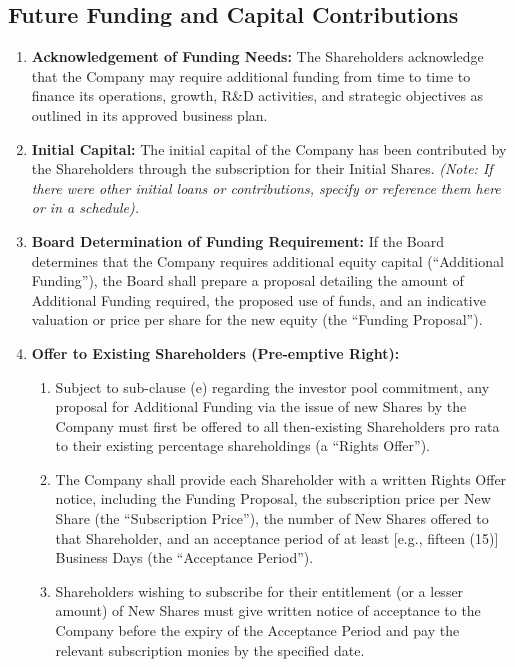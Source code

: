 \subsection{Future Funding and Capital Contributions} \label{subsec:FutureFunding}
\begin{enumerate}[label=(\alph*)]
\item \textbf{Acknowledgement of Funding Needs:} The Shareholders acknowledge that the Company may require additional funding from time to time to finance its operations, growth, R\&D activities, and strategic objectives as outlined in its approved business plan.
\item \textbf{Initial Capital:} The initial capital of the Company has been contributed by the Shareholders through the subscription for their Initial Shares. \textit{(Note: If there were other initial loans or contributions, specify or reference them here or in a schedule).}
\item \textbf{Board Determination of Funding Requirement:} If the Board determines that the Company requires additional equity capital (``Additional Funding''), the Board shall prepare a proposal detailing the amount of Additional Funding required, the proposed use of funds, and an indicative valuation or price per share for the new equity (the ``Funding Proposal'').
\item \textbf{Offer to Existing Shareholders (Pre-emptive Right):}
    \begin{enumerate}[label=(\roman*)]
    \item Subject to sub-clause (e) regarding the investor pool commitment, any proposal for Additional Funding via the issue of new Shares by the Company must first be offered to all then-existing Shareholders pro rata to their existing percentage shareholdings (a ``Rights Offer'').
    \item The Company shall provide each Shareholder with a written Rights Offer notice, including the Funding Proposal, the subscription price per New Share (the ``Subscription Price''), the number of New Shares offered to that Shareholder, and an acceptance period of at least [e.g., fifteen (15)] Business Days (the ``Acceptance Period'').
    \item Shareholders wishing to subscribe for their entitlement (or a lesser amount) of New Shares must give written notice of acceptance to the Company before the expiry of the Acceptance Period and pay the relevant subscription monies by the specified date.
    \end{enumerate}

\end{enumerate}
